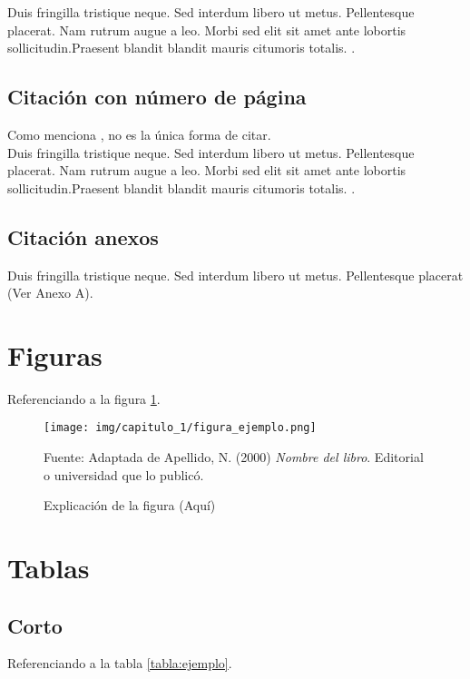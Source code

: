 Duis fringilla tristique neque. Sed interdum libero ut metus.
Pellentesque placerat. Nam rutrum augue a leo. Morbi sed 
elit sit amet ante lobortis sollicitudin.Praesent blandit 
blandit mauris citumoris totalis. \cite{libro:ejemplo_varios_autores}.

\subsection{Citación con número de página}

Como menciona , no es la única
forma de citar.\\

Duis fringilla tristique neque. Sed interdum libero ut metus.
Pellentesque placerat. Nam rutrum augue a leo. Morbi sed 
elit sit amet ante lobortis sollicitudin.Praesent blandit 
blandit mauris citumoris totalis. \cite[p.~7-12]{libro:ejemplo_varios_autores}.

\subsection{Citación anexos}
Duis fringilla tristique neque. Sed interdum libero ut metus.
Pellentesque placerat (Ver Anexo A).

\section{Figuras}
Referenciando a la figura \ref{fig:ejemplo}.

\begin{figure}[H]
    \begin{center}
        \texttt{[image: img/capitulo\_1/figura\_ejemplo.png]}
    \end{center}
    \caption{Explicación de la figura (Aquí)}
    Fuente: Adaptada de Apellido, N. (2000) \textit{Nombre del libro}.
    Editorial o universidad que lo publicó.
    \label{fig:ejemplo}
\end{figure}

\section{Tablas}

\subsection{Corto}
Referenciando a la tabla \ref{tabla:ejemplo}.\\

